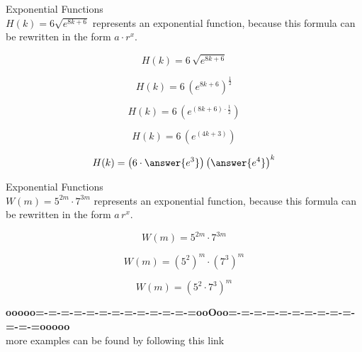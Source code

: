 \documentclass{ximera}
\begin{document}
\begin{example}  Exponential Functions \\



$H(k) = 6 \sqrt{e^{8 k + 6}} $ represents an exponential function, because this formula can be rewritten in the form $a \cdot r^x$.   \\


\begin{explanation}


\[
H(k) = 6 \, \sqrt{e^{8 k + 6}}
\]


\[
H(k) = 6 \, \left( e^{8 k + 6} \right)^{\tfrac{1}{2}}
\]

\[
H(k) = 6 \, \left( e^{(8 k + 6 ) \cdot \tfrac{1}{2}} \right)
\]

\[
H(k) = 6 \, \left( e^{(4 k + 3)} \right)
\]

\[
H(k) = \left( 6 \cdot \answer{e^3} \right) \left( \answer{e^4} \right)^k
\]


\end{explanation}

\end{example}

















\begin{example}  Exponential Functions \\



$W(m) = 5^{2 m} \cdot 7^{3 m}$ represents an exponential function, because this formula can be rewritten in the form $a \, r^x$.   \\


\begin{explanation}


\[
W(m) = 5^{2 m} \cdot 7^{3 m}
\]


\[
W(m) = \left( 5^2 \right)^m \cdot \left( 7^3 \right)^m
\]

\[
W(m) = \left( 5^2 \cdot 7^3 \right)^m 
\]




\end{explanation}

\end{example}









\begin{center}
\textbf{\textcolor{green!50!black}{ooooo=-=-=-=-=-=-=-=-=-=-=-=-=ooOoo=-=-=-=-=-=-=-=-=-=-=-=-=ooooo}} \\

more examples can be found by following this link\\ 

\end{center}
\end{document}
